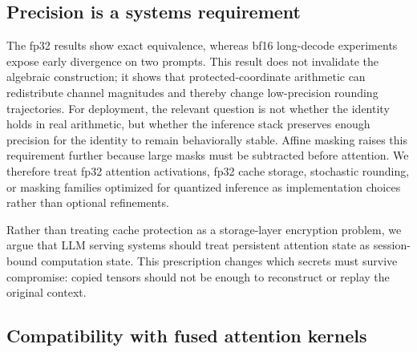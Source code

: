 \subsection{Precision is a systems requirement}

The fp32 results show exact equivalence, whereas bf16 long-decode experiments expose early divergence on two prompts. This result does not invalidate the algebraic construction; it shows that protected-coordinate arithmetic can redistribute channel magnitudes and thereby change low-precision rounding trajectories. For deployment, the relevant question is not whether the identity holds in real arithmetic, but whether the inference stack preserves enough precision for the identity to remain behaviorally stable. Affine masking raises this requirement further because large masks must be subtracted before attention. We therefore treat fp32 attention activations, fp32 cache storage, stochastic rounding, or masking families optimized for quantized inference as implementation choices rather than optional refinements.

Rather than treating cache protection as a storage-layer encryption problem, we argue that LLM serving systems should treat persistent attention state as session-bound computation state. This prescription changes which secrets must survive compromise: copied tensors should not be enough to reconstruct or replay the original context.

\subsection{Compatibility with fused attention kernels}

